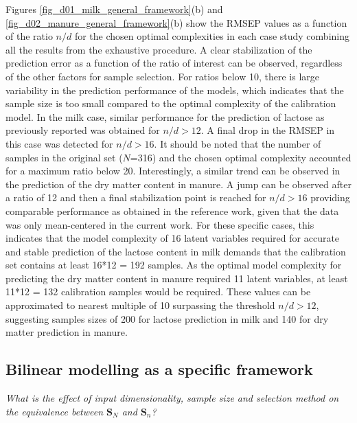 \documentclass[preprint,12pt]{elsarticle}
\begin{document}
Figures \ref{fig_d01_milk_general_framework}(b) and \ref{fig_d02_manure_general_framework}(b) show the RMSEP values as a function of the ratio $n/d$ for the chosen optimal complexities in each case study combining all the results from the exhaustive procedure. A clear stabilization of the prediction error as a function of the ratio of interest can be observed, regardless of the other factors for sample selection. For ratios below 10, there is large variability in the prediction performance of the models, which indicates that the sample size is too small compared to the optimal complexity of the calibration model. In the milk case, similar performance for the prediction of lactose as previously reported \cite{Diaz-Olivares2020, Aernouts2011} was obtained for $n/d>12$. A final drop in the RMSEP in this case was detected for $n/d>16$. It should be noted that the number of samples in the original set ($N$=316) and the chosen optimal complexity accounted for a maximum ratio below 20. Interestingly, a similar trend can be observed in the prediction of the dry matter content in manure. A jump can be observed after a ratio of 12 and then a final stabilization point is reached for $n/d>16$ providing comparable performance as obtained in the reference work, given that the data was only mean-centered in the current work\cite{Saeys2005}. For these specific cases, this indicates that the model complexity of 16 latent variables required for accurate and stable prediction of the lactose content in milk demands that the calibration set contains at least 16*12 = 192 samples. As the optimal model complexity for predicting the dry matter content in manure required 11 latent variables, at least 11*12 = 132 calibration samples would be required. These values can be approximated to nearest multiple of 10 surpassing the threshold $n/d>12$, suggesting samples sizes of 200 for lactose prediction in milk and 140 for dry matter prediction in manure.



\subsection{Bilinear modelling as a specific framework}\label{results:specframework}

\emph{What is the effect of input dimensionality, sample size and selection method on the equivalence between $\mathbf{S}_N$ and $\mathbf{S}_n$?} 
\end{document}

